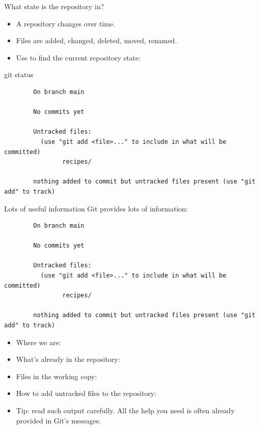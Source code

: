 \begin{frame}[fragile]{What state is the repository in?}
    \begin{itemize}
        \item A repository changes over time.
        \item Files are added, changed, deleted, moved, renamed.
        \item Use  to find the current repository state:
    \end{itemize}
    \begin{shellcode}
        git status
    \end{shellcode}
    \begin{verbatim}
        On branch main

        No commits yet

        Untracked files:
          (use "git add <file>..." to include in what will be committed)
                recipes/

        nothing added to commit but untracked files present (use "git add" to track)
    \end{verbatim}
\end{frame}

\begin{frame}[fragile]{Lots of useful information}
    Git provides lots of information:
    \begin{verbatim}
        On branch main

        No commits yet

        Untracked files:
          (use "git add <file>..." to include in what will be committed)
                recipes/

        nothing added to commit but untracked files present (use "git add" to track)
    \end{verbatim}

    \begin{itemize}
        \item Where we are: 
        \item What's already in the repository: 
        \item Files in the working copy: 
        \item How to add untracked files to the repository: 
        \item {} Tip: read such output carefully.  All the help
            you need is often already provided in Git's messages.
    \end{itemize}
\end{frame}

